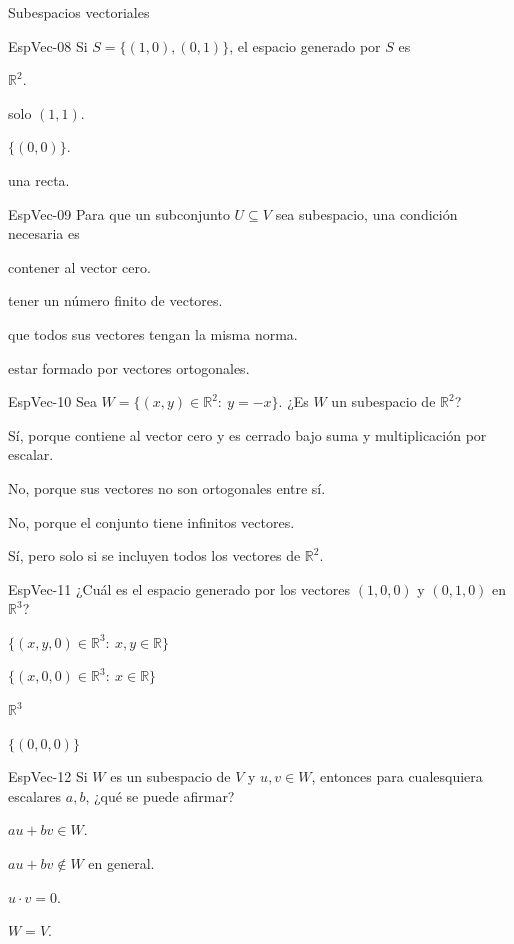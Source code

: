 \documentclass[a4,11pt]{aleph-notas}
\begin{document}
\begin{quiz}{Subespacios vectoriales}
\begin{multi}[]%
    {EspVec-08}
    Si \(S=\{(1,0),(0,1)\}\), el espacio generado por \(S\) es
    \item* \(\mathbb{R}^2\).
    \item solo \((1,1)\).
    \item \(\{(0,0)\}\).
    \item una recta.
\end{multi}

\begin{multi}[]%
    {EspVec-09}
    Para que un subconjunto \(U\subseteq V\) sea subespacio, una condición necesaria es
    \item* contener al vector cero.
    \item tener un número finito de vectores.
    \item que todos sus vectores tengan la misma norma.
    \item estar formado por vectores ortogonales.
\end{multi}

\begin{multi}[]%
    {EspVec-10}
    Sea \(W=\{(x,y)\in\mathbb{R}^2:\ y=-x\}\). ¿Es \(W\) un subespacio de \(\mathbb{R}^2\)?
    \item* Sí, porque contiene al vector cero y es cerrado bajo suma y multiplicación por escalar.
    \item No, porque sus vectores no son ortogonales entre sí.
    \item No, porque el conjunto tiene infinitos vectores.
    \item Sí, pero solo si se incluyen todos los vectores de \(\mathbb{R}^2\).
\end{multi}

\begin{multi}[]%
    {EspVec-11}
    ¿Cuál es el espacio generado por los vectores \((1,0,0)\) y \((0,1,0)\) en \(\mathbb{R}^3\)?
    \item* \(\{(x,y,0)\in\mathbb{R}^3:\ x,y\in\mathbb{R}\}\)
    \item \(\{(x,0,0)\in\mathbb{R}^3:\ x\in\mathbb{R}\}\)
    \item \(\mathbb{R}^3\)
    \item \(\{(0,0,0)\}\)
\end{multi}

\begin{multi}[]%
    {EspVec-12}
    Si \(W\) es un subespacio de \(V\) y \(u,v\in W\), entonces para cualesquiera escalares \(a,b\), ¿qué se puede afirmar?
    \item* \(au+bv\in W\).
    \item \(au+bv\notin W\) en general.
    \item \(u\cdot v=0\).
    \item \(W=V\).
\end{multi}


\end{quiz}
\end{document}
